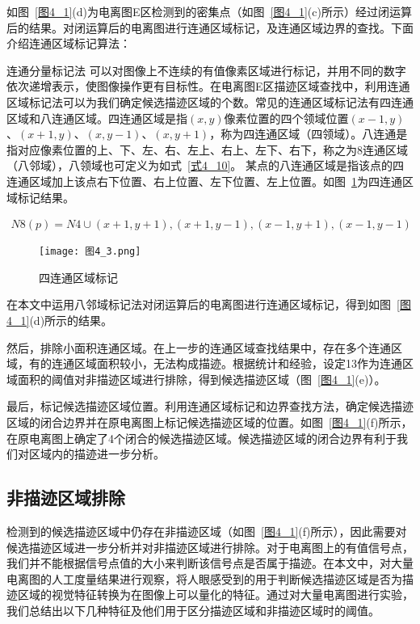 如图~\ref{图4_1}(d)为电离图E区检测到的密集点（如图~\ref{图4_1}(c)所示）经过闭运算后的结果。对闭运算后的电离图进行连通区域标记，及连通区域边界的查找。下面介绍连通区域标记算法：

连通分量标记法 \cite{di1999simple}可以对图像上不连续的有值像素区域进行标记，并用不同的数字依次递增表示，使图像操作更有目标性。在电离图E区描迹区域查找中，利用连通区域标记法可以为我们确定候选描迹区域的个数。常见的连通区域标记法有四连通区域和八连通区域。四连通区域是指$(x,y)$像素位置的四个领域位置$(x-1,y)$、$(x+1,y)$、$(x,y-1)$、$(x,y+1)$，称为四连通区域（四领域）。八连通是指对应像素位置的上、下、左、右、左上、右上、左下、右下，称之为8连通区域（八邻域），八领域也可定义为如式~\ref{式4_10}。 某点的八连通区域是指该点的四连通区域加上该点右下位置、右上位置、左下位置、左上位置。如图~\ref{图4_3}为四连通区域标记结果。
\begin{linenomath}
\begin{align}
 N8(p)=N4\cup (x+1,y+1),(x+1,y-1),(x-1,y+1),(x-1,y-1)
\label{式4_10}
\end{align}
\end{linenomath}
 
\begin{figure}[!ht]
\centering
\texttt{[image: 图4\_3.png]}
\caption{四连通区域标记}
\label{图4_3}
\end{figure} 	 
 
在本文中运用八邻域标记法对闭运算后的电离图进行连通区域标记，得到如图~\ref{图4_1}(d)所示的结果。
                       
然后，排除小面积连通区域。在上一步的连通区域查找结果中，存在多个连通区域，有的连通区域面积较小，无法构成描迹。根据统计和经验，设定13作为连通区域面积的阈值对非描迹区域进行排除，得到候选描迹区域（图~\ref{图4_1}(e)）。

最后，标记候选描迹区域位置。利用连通区域标记和边界查找方法，确定候选描迹区域的闭合边界并在原电离图上标记候选描迹区域的位置。如图~\ref{图4_1}(f)所示，在原电离图上确定了4个闭合的候选描迹区域。候选描迹区域的闭合边界有利于我们对区域内的描迹进一步分析。
 
\subsection{非描迹区域排除}
\label{4_1_2}
检测到的候选描迹区域中仍存在非描迹区域（如图~\ref{图4_1}(f)所示），因此需要对候选描迹区域进一步分析并对非描迹区域进行排除。对于电离图上的有值信号点，我们并不能根据信号点值的大小来判断该信号点是否属于描迹。在本文中，对大量电离图的人工度量结果进行观察，将人眼感受到的用于判断候选描迹区域是否为描迹区域的视觉特征转换为在图像上可以量化的特征。通过对大量电离图进行实验，我们总结出以下几种特征及他们用于区分描迹区域和非描迹区域时的阈值。


